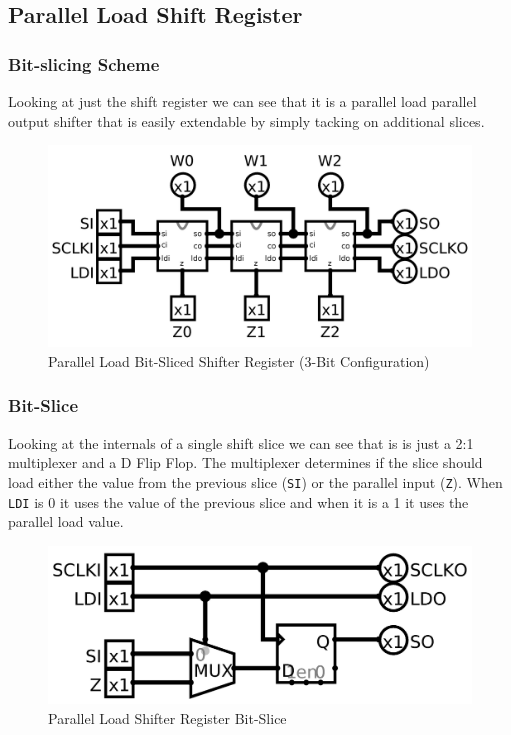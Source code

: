     \newpage
    \subsection{Parallel Load Shift Register}

        \subsubsection{Bit-slicing Scheme}
        Looking at just the shift register we can see that it is a parallel
        load parallel output shifter that is easily extendable by simply
        tacking on additional slices.
        \begin{figure}[H]
            \centering
            \includegraphics[width=\linewidth]{../../logisim/shift.png}
            \caption{Parallel Load Bit-Sliced Shifter Register (3-Bit Configuration)}
        \end{figure}

        \subsubsection{Bit-Slice}
        Looking at the internals of a single shift slice we can see that is is
        just a 2:1 multiplexer and a D Flip Flop. The multiplexer determines if
        the slice should load either the value from the previous slice
        (\texttt{SI}) or the parallel input (\texttt{Z}). When \texttt{LDI} is
        0 it uses the value of the previous slice and when it is a 1 it uses
        the parallel load value.
        \begin{figure}[H]
            \centering
            \includegraphics[width=\linewidth]{../../logisim/shift_slice.png}
            \caption{Parallel Load Shifter Register Bit-Slice}
        \end{figure}

